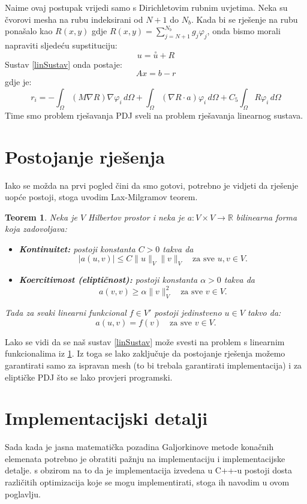 \documentclass[zavrsnirad]{../fer}
\newtheorem{teorem}{Teorem}
\begin{document}
Naime ovaj postupak vrijedi samo s Dirichletovim
rubnim uvjetima. Neka su čvorovi mesha na rubu indeksirani
od $N+1$ do $N_b$.
Kada bi se rješenje na rubu ponašalo kao
$R(x,y)$ gdje $R(x,y) = \sum_{j=N + 1}^{N_b} g_j \varphi_j$,
onda bismo morali napraviti sljedeću
supstituciju:
$$u = \overset{\circ}u + R$$
Sustav \ref{linSustav}
onda postaje:
$$Ax = b - r$$
gdje je:
$$r_i = - \int_{\Omega}(M\nabla R) \nabla \varphi_i \, d \Omega +
\int_{\Omega}(\nabla R \cdot a) \varphi_i \, d \Omega +
C_5 \int_{\Omega} R \varphi_i\, d\Omega
$$
Time smo problem rješavanja PDJ sveli na problem
rješavanja linearnog sustava.
\section{Postojanje rješenja}
\label{postojanje}
Iako se možda na prvi pogled čini da smo gotovi, potrebno 
je vidjeti da rješenje uopće postoji, stoga uvodim 
Lax-Milgramov teorem.
\begin{teorem}
  \label{laxMil}
Neka je $ V $ Hilbertov prostor i neka je $ a: V \times V \rightarrow \mathbb{R} $ bilinearna forma koja zadovoljava:
\begin{itemize}
    \item \textbf{Kontinuitet:} postoji konstanta $ C > 0 $ takva da
    $$
    |a(u, v)| \leq C \|u\|_V \|v\|_V \quad \text{za sve } u, v \in V.
    $$
    
    \item \textbf{Koercitivnost (eliptičnost):} postoji konstanta $ \alpha > 0 $ takva da
    $$
    a(v, v) \geq \alpha \|v\|_V^2 \quad \text{za sve } v \in V.
    $$
\end{itemize}

Tada za svaki linearni funkcional $ f \in V' $ postoji jedinstveno $ u \in V $ takvo da:
$$
a(u, v) = f(v) \quad \text{za sve } v \in V.
$$
\end{teorem}
Lako se vidi da se naš sustav \ref{linSustav} 
može svesti na problem s linearnim funkcionalima iz
\ref{laxMil}. Iz toga se lako zaključuje da
postojanje rješenja možemo garantirati samo za ispravan mesh
(to bi trebala garantirati implementacija) i za eliptičke PDJ što se lako provjeri programski.

\newpage
\section{Implementacijski detalji}
\label{implementacijaOpis}
Sada kada je jasna matematička pozadina 
Galjorkinove metode konačnih elemenata potrebno je 
obratiti pažnju na implementaciju i implementacijske detalje.
s obzirom na to da je implementacija izvedena u C++-u postoji
dosta različitih optimizacija koje se mogu implementirati,
stoga ih navodim u ovom poglavlju.
\end{document}
